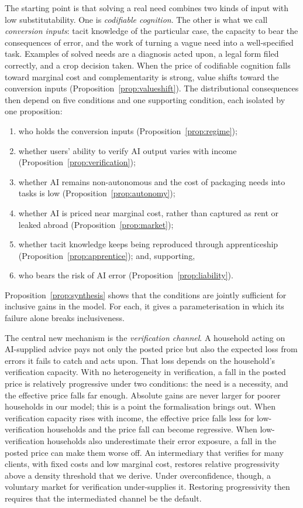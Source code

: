 \documentclass[12pt]{article}
\theoremstyle{remark}
\begin{document}
The starting point is that solving a real need combines two kinds of input with low substitutability. One is \emph{codifiable cognition}. The other is what we call \emph{conversion inputs}: tacit knowledge of the particular case, the capacity to bear the consequences of error, and the work of turning a vague need into a well-specified task. Examples of solved needs are a diagnosis acted upon, a legal form filed correctly, and a crop decision taken. When the price of codifiable cognition falls toward marginal cost and complementarity is strong, value shifts toward the conversion inputs (Proposition~\ref{prop:valueshift}). The distributional consequences then depend on five conditions and one supporting condition, each isolated by one proposition:
\begin{enumerate}[label=(\arabic*),leftmargin=2em,itemsep=0pt]
\item who holds the conversion inputs (Proposition~\ref{prop:regime});
\item whether users' ability to verify AI output varies with income (Proposition~\ref{prop:verification});
\item whether AI remains non-autonomous and the cost of packaging needs into tasks is low (Proposition~\ref{prop:autonomy});
\item whether AI is priced near marginal cost, rather than captured as rent or leaked abroad (Proposition~\ref{prop:market});
\item whether tacit knowledge keeps being reproduced through apprenticeship (Proposition~\ref{prop:apprentice}); and, supporting,
\item who bears the risk of AI error (Proposition~\ref{prop:liability}).
\end{enumerate}
Proposition~\ref{prop:synthesis} shows that the conditions are jointly sufficient for inclusive gains in the model. For each, it gives a parameterisation in which its failure alone breaks inclusiveness.

The central new mechanism is the \emph{verification channel}. A household acting on AI-supplied advice pays not only the posted price but also the expected loss from errors it fails to catch and acts upon. That loss depends on the household's verification capacity. With no heterogeneity in verification, a fall in the posted price is relatively progressive under two conditions: the need is a necessity, and the effective price falls far enough. Absolute gains are never larger for poorer households in our model; this is a point the formalisation brings out. When verification capacity rises with income, the effective price falls less for low-verification households and the price fall can become regressive. When low-verification households also underestimate their error exposure, a fall in the posted price can make them worse off. An intermediary that verifies for many clients, with fixed costs and low marginal cost, restores relative progressivity above a density threshold that we derive. Under overconfidence, though, a voluntary market for verification under-supplies it. Restoring progressivity then requires that the intermediated channel be the default.
\end{document}
